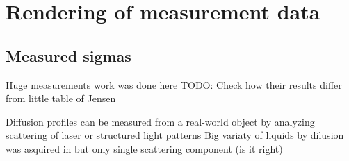 \chapter{Rendering of measurement data}
\label{chapter:measurements}


\section{Measured sigmas}
Huge measurements work was done here \cite{Gkioulekas:2013:IVR:2508363.2508377}
TODO: Check how their results differ from little table of Jensen
\cite{Jensen:2001:PMS:383259.383319}

Diffusion profiles can be measured from a real-world object by
analyzing scattering of laser \cite{Jensen:2001:PMS:383259.383319} or
structured light patterns \cite{tariq_efficient_2006-1} Big variaty of
liquids by dilusion was asquired in
\cite{Narasimhan:2006:ASP:1141911.1141986} but only single scattering
component (is it right)